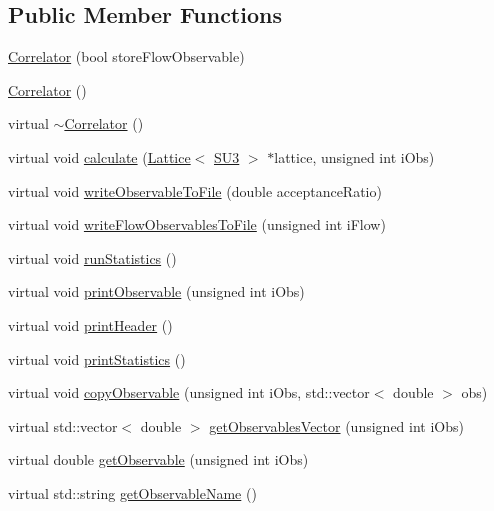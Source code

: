 \subsection*{Public Member Functions}
\begin{DoxyCompactItemize}
\item 
\mbox{\hyperlink{class_correlator_aff48ef3bf789e9c6231eacc21cd9ed9a}{Correlator}} (bool store\+Flow\+Observable)
\item 
\mbox{\hyperlink{class_correlator_a6114955836dba0b4b61138490cd3fe91}{Correlator}} ()
\item 
virtual \mbox{\hyperlink{class_correlator_a48307431ca91b41319c6b68c6684634d}{$\sim$\+Correlator}} ()
\item 
virtual void \mbox{\hyperlink{class_correlator_ab33502ff305f891c5c2e6d66a26a0247}{calculate}} (\mbox{\hyperlink{class_lattice}{Lattice}}$<$ \mbox{\hyperlink{class_s_u3}{S\+U3}} $>$ $\ast$lattice, unsigned int i\+Obs)
\item 
virtual void \mbox{\hyperlink{class_correlator_a9e8d80e30e4fbe3b7fe57521538cb5ff}{write\+Observable\+To\+File}} (double acceptance\+Ratio)
\item 
virtual void \mbox{\hyperlink{class_correlator_a168512b2ce182d9478db47f100125fa6}{write\+Flow\+Observables\+To\+File}} (unsigned int i\+Flow)
\item 
virtual void \mbox{\hyperlink{class_correlator_a35197b1d12b62ef30b79c0138a26456e}{run\+Statistics}} ()
\item 
virtual void \mbox{\hyperlink{class_correlator_a15744ddb9f2b71fff34ac762d101df38}{print\+Observable}} (unsigned int i\+Obs)
\item 
virtual void \mbox{\hyperlink{class_correlator_ac7c5a07d7cbee97c417a1659b93083b2}{print\+Header}} ()
\item 
virtual void \mbox{\hyperlink{class_correlator_a2168d677f547769784781d2e2aaa53cf}{print\+Statistics}} ()
\item 
virtual void \mbox{\hyperlink{class_correlator_ac780d8b180294ee4801ede6e6a13f7f4}{copy\+Observable}} (unsigned int i\+Obs, std\+::vector$<$ double $>$ obs)
\item 
virtual std\+::vector$<$ double $>$ \mbox{\hyperlink{class_correlator_a7fb062b098beb078f3e546f4717b4941}{get\+Observables\+Vector}} (unsigned int i\+Obs)
\item 
virtual double \mbox{\hyperlink{class_correlator_aada8184c033e0465f540a368465c9ba5}{get\+Observable}} (unsigned int i\+Obs)
\item 
virtual std\+::string \mbox{\hyperlink{class_correlator_ad1fa59e864917c3e48da037f90c3488f}{get\+Observable\+Name}} ()

\end{DoxyCompactItemize}
